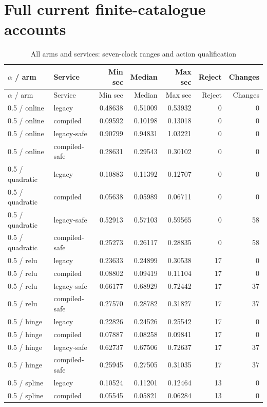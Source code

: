 \section{Full current finite-catalogue accounts}\label{dev:catalogue109}
\begingroup\scriptsize
\begin{longtable}{@{}llrrrrr@{}}\caption{All arms and services: seven-clock ranges and action qualification}\label{tab:all109}\\
\toprule $\alpha$ / arm & Service & Min sec & Median & Max sec & Reject & Changes\\\midrule\endfirsthead
\toprule $\alpha$ / arm & Service & Min sec & Median & Max sec & Reject & Changes\\\midrule\endhead
0.5 / online & legacy & 0.48638 & 0.51009 & 0.53932 & 0 & 0\\
0.5 / online & compiled & 0.09592 & 0.10198 & 0.13018 & 0 & 0\\
0.5 / online & legacy-safe & 0.90799 & 0.94831 & 1.03221 & 0 & 0\\
0.5 / online & compiled-safe & 0.28631 & 0.29543 & 0.30102 & 0 & 0\\
0.5 / quadratic & legacy & 0.10883 & 0.11392 & 0.12707 & 0 & 0\\
0.5 / quadratic & compiled & 0.05638 & 0.05989 & 0.06711 & 0 & 0\\
0.5 / quadratic & legacy-safe & 0.52913 & 0.57103 & 0.59565 & 0 & 58\\
0.5 / quadratic & compiled-safe & 0.25273 & 0.26117 & 0.28835 & 0 & 58\\
0.5 / relu & legacy & 0.23633 & 0.24899 & 0.30538 & 17 & 0\\
0.5 / relu & compiled & 0.08802 & 0.09419 & 0.11104 & 17 & 0\\
0.5 / relu & legacy-safe & 0.66177 & 0.68929 & 0.72442 & 17 & 37\\
0.5 / relu & compiled-safe & 0.27570 & 0.28782 & 0.31827 & 17 & 37\\
0.5 / hinge & legacy & 0.22826 & 0.24526 & 0.25542 & 17 & 0\\
0.5 / hinge & compiled & 0.07887 & 0.08258 & 0.09841 & 17 & 0\\
0.5 / hinge & legacy-safe & 0.62737 & 0.67506 & 0.72637 & 17 & 37\\
0.5 / hinge & compiled-safe & 0.25945 & 0.27505 & 0.31035 & 17 & 37\\
0.5 / spline & legacy & 0.10524 & 0.11201 & 0.12464 & 13 & 0\\
0.5 / spline & compiled & 0.05545 & 0.05821 & 0.06284 & 13 & 0\\

\end{longtable}
